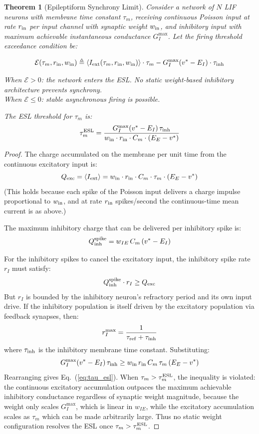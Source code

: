 \documentclass{article}
\newtheorem{theorem}{Theorem}
\begin{document}
\begin{theorem}[Epileptiform Synchrony Limit]
\label{thm:esl}
Consider a network of $N$ LIF neurons with membrane time constant $\tau_m$, receiving continuous Poisson input at rate $r_{\rm in}$ per input channel with synaptic weight $w_{\rm in}$, and inhibitory input with maximum achievable instantaneous conductance $G_I^{\max}$. Let the firing threshold exceedance condition be:

\begin{equation}
\mathcal{E}(\tau_m, r_{\rm in}, w_{\rm in}) \triangleq \langle I_{\rm ext}(\tau_m, r_{\rm in}, w_{\rm in}) \rangle \cdot \tau_m - G_I^{\max}(v^* - E_I) \cdot \tau_{\rm inh}
\label{eq:excess}
\end{equation}

When $\mathcal{E} > 0$: the network enters the ESL. No static weight-based inhibitory architecture prevents synchrony.\\
When $\mathcal{E} \leq 0$: stable asynchronous firing is possible.

The ESL threshold for $\tau_m$ is:
\begin{equation}
\tau_m^{\rm ESL} = \frac{G_I^{\max}(v^* - E_I)\,\tau_{\rm inh}}{w_{\rm in} \cdot r_{\rm in} \cdot C_m \cdot (E_E - v^*)}
\label{eq:tau_esl}
\end{equation}
\end{theorem}

\begin{proof}
The charge accumulated on the membrane per unit time from the continuous excitatory input is:
\[
Q_{\rm exc} = \langle I_{\rm ext} \rangle = w_{\rm in} \cdot r_{\rm in} \cdot C_m \cdot \tau_m \cdot (E_E - v^*)
\]
(This holds because each spike of the Poisson input delivers a charge impulse proportional to $w_{\rm in}$, and at rate $r_{\rm in}$ spikes/second the continuous-time mean current is as above.)

The maximum inhibitory charge that can be delivered per inhibitory spike is:
\[
Q_{\rm inh}^{\rm spike} = w_{IE}\, C_m\,(v^* - E_I)
\]

For the inhibitory spikes to cancel the excitatory input, the inhibitory spike rate $r_I$ must satisfy:
\[
Q_{\rm inh}^{\rm spike} \cdot r_I \geq Q_{\rm exc}
\]
But $r_I$ is bounded by the inhibitory neuron's refractory period and its own input drive. If the inhibitory population is itself driven by the excitatory population via feedback synapses, then:
\[
r_I^{\max} = \frac{1}{\tau_{\rm ref} + \tau_{\rm inh}}
\]
where $\tau_{\rm inh}$ is the inhibitory membrane time constant. Substituting:
\[
G_I^{\max}(v^* - E_I)\,\tau_{\rm inh} \geq w_{\rm in}\,r_{\rm in}\,C_m\,\tau_m\,(E_E - v^*)
\]
Rearranging gives Eq.~(\ref{eq:tau_esl}). When $\tau_m > \tau_m^{\rm ESL}$, the inequality is violated: the continuous excitatory accumulation outpaces the maximum achievable inhibitory conductance regardless of synaptic weight magnitude, because the weight only scales $G_I^{\max}$, which is linear in $w_{IE}$, while the excitatory accumulation scales as $\tau_m$ which can be made arbitrarily large. Thus no static weight configuration resolves the ESL once $\tau_m > \tau_m^{\rm ESL}$.
\end{proof}
\end{document}

